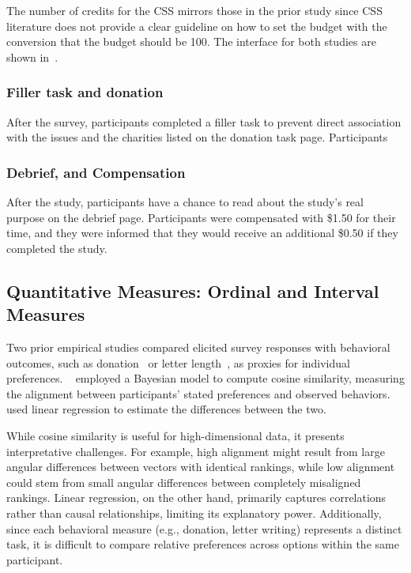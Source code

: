 The number of credits for the CSS mirrors those in the prior study since CSS literature does not provide a clear guideline on how to set the budget with the conversion that the budget should be 100. The interface for both studies are shown in~.

\subsubsection{Filler task and donation}
After the survey, participants completed a filler task to prevent direct association with the issues and the charities listed on the donation task page. Participants 

\subsubsection{Debrief, and Compensation}
After the study, participants have a chance to read about the study's real purpose on the debrief page. Participants were compensated with \$1.50 for their time, and they were informed that they would receive an additional \$0.50 if they completed the study.

\subsection{Quantitative Measures: Ordinal and Interval Measures}
\label{sec:quantitative_measures}
Two prior empirical studies compared elicited survey responses with behavioral outcomes, such as donation~\cite{chengCanShowWhat2021,cavaille2024cares} or letter length~\cite{cavaille2024cares}, as proxies for individual preferences. ~\citet{chengCanShowWhat2021} employed a Bayesian model to compute cosine similarity, measuring the alignment between participants' stated preferences and observed behaviors. ~\citet{cavaille2024cares} used linear regression to estimate the differences between the two.

While cosine similarity is useful for high-dimensional data, it presents interpretative challenges. For example, high alignment might result from large angular differences between vectors with identical rankings, while low alignment could stem from small angular differences between completely misaligned rankings. Linear regression, on the other hand, primarily captures correlations rather than causal relationships, limiting its explanatory power. Additionally, since each behavioral measure (e.g., donation, letter writing) represents a distinct task, it is difficult to compare relative preferences across options within the same participant.

